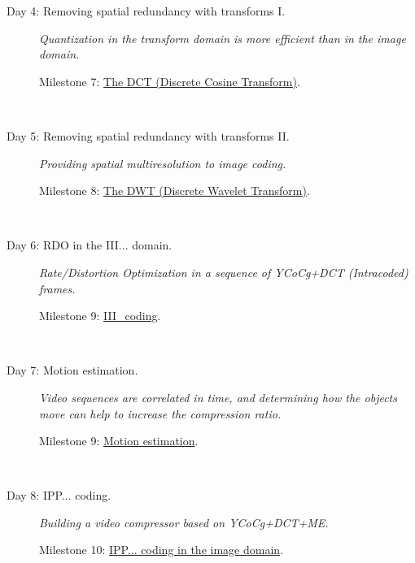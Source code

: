 \begin{description}
\item [Day 4: {\normalfont Removing spatial redundancy with transforms I.}]
  \emph{Quantization in the transform domain is more efficient than in the image domain.}
  \begin{description}
  \item [Milestone 7: {\normalfont \href{https://sistemas-multimedia.github.io/milestones/07-DWT/}{The DCT (Discrete Cosine Transform)}.}]
  \end{description}
  ~\newline

\item [Day 5: {\normalfont Removing spatial redundancy with transforms II.}]
  \emph{Providing spatial multiresolution to image coding.}
  \begin{description}
  \item [Milestone 8: {\normalfont \href{https://sistemas-multimedia.github.io/milestones/08-DWT/}{The DWT (Discrete Wavelet Transform)}.}]
  \end{description}
  ~\newline

\item [Day 6: {\normalfont RDO in the III... domain.}]
  \emph{Rate/Distortion Optimization in a sequence of YCoCg+DCT
  (Intracoded) frames.}
  \begin{description}
  \item [Milestone 9: {\normalfont \href{https://sistemas-multimedia.github.io/milestones/09-III/}{III\_coding}.}]
  \end{description}
  ~\newline

\item [Day 7: {\normalfont Motion estimation.}]
  \emph{Video sequences are correlated in time, and determining how the objects move can help to increase the compression ratio.}
  \begin{description}
  \item [Milestone 9: {\normalfont \href{https://sistemas-multimedia.github.io/milestones/10-ME/}{Motion estimation}.}]
  \end{description}
  ~\newline

\item [Day 8: {\normalfont IPP... coding.}]
  \emph{Building a video compressor based on YCoCg+DCT+ME.}
  \begin{description}
  \item [Milestone 10: {\normalfont \href{https://sistemas-multimedia.github.io/milestones/11-image_domain_IPP/}{IPP... coding in the image domain}.}]
  \end{description}
  ~\newline


\end{description}
